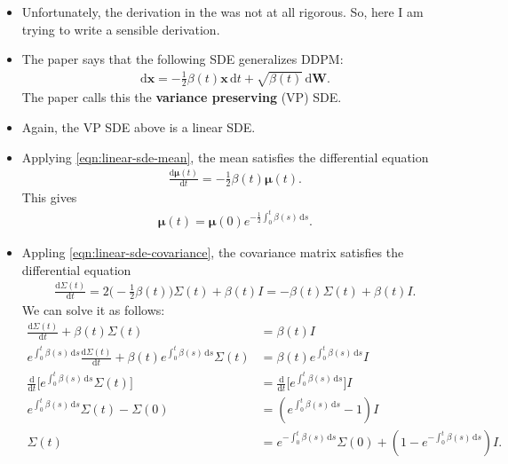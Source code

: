 \documentclass[10pt]{article}
\newcommand{\dee}{\mathrm{d}}
\newcommand{\ve}[1]{\mathbf{#1}}
\newcommand{\ves}[1]{\boldsymbol{#1}}
\begin{document}
\begin{itemize}
  \item Unfortunately, the derivation in the \cite{Song:2021} was not at all rigorous. So, here I am trying to write a sensible derivation.
  
  \item The paper says that the following SDE generalizes DDPM:
  \begin{align*}
    \dee \ve{x} = -\frac{1}{2} \beta(t)\ve{x}\, \dee t + \sqrt{\beta(t)}\, \dee \ve{W}.
  \end{align*}
  The paper calls this the {\bf variance preserving} (VP) SDE.

  \item Again, the VP SDE above is a linear SDE.
  
  \item Applying \eqref{eqn:linear-sde-mean}, the mean satisfies the differential equation
  \begin{align*}
    \frac{\dee \ves{\mu}(t)}{\dee t} = -\frac{1}{2} \beta(t) \ves{\mu}(t).
  \end{align*}
  This gives
  \begin{align*}
    \ves{\mu}(t) 
    = \ves{\mu}(0) e^{-\frac{1}{2}\int_0^t \beta(s)\, \dee s}.
  \end{align*}

  \item Appling \eqref{eqn:linear-sde-covariance}, the covariance matrix satisfies the differential equation
  \begin{align*}
    \frac{\dee \Sigma(t)}{\dee t} 
    = 2\bigg( -\frac{1}{2}\beta(t) \bigg) \Sigma(t) + \beta(t) I 
    = -\beta(t) \Sigma(t) + \beta(t) I.
  \end{align*}
  We can solve it as follows:
  \begin{align*}
    \frac{\dee \Sigma(t)}{\dee t} + \beta(t) \Sigma(t) 
    &= \beta(t) I \\
    e^{\int_0^t \beta(s)\, \dee s} \frac{\dee \Sigma(t)}{\dee t} + \beta(t) e^{\int_0^t \beta(s)\, \dee s} \Sigma(t) 
    &= \beta(t) e^{\int_0^t \beta(s)\, \dee s} I \\
    \frac{\dee}{\dee t} \bigg[ e^{\int_0^t \beta(s)\, \dee s} \Sigma(t) \bigg]
    &= \frac{\dee}{\dee t}\Big[ e^{\int_0^t \beta(s)\, \dee s}  \Big] I \\
    e^{\int_0^t \beta(s)\, \dee s} \Sigma(t) - \Sigma(0)
    &= (e^{\int_0^t \beta(s)\, \dee s} - 1) I \\
    \Sigma(t) 
    &= e^{- \int_0^t \beta(s)\, \dee s}\Sigma(0) + (1 - e^{- \int_0^t \beta(s)\, \dee s}) I.
  \end{align*}


\end{itemize}
\end{document}
